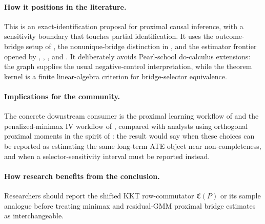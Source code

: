 \documentclass[11pt]{article}
\theoremstyle{definition}
\theoremstyle{plain}
\theoremstyle{remark}
\begin{document}
\paragraph{How it positions in the literature.}
This is an exact-identification proposal for proximal causal inference, with a sensitivity boundary that touches partial identification. It uses the outcome-bridge setup of \citet{MiaoGengTchetgen2018}, the nonunique-bridge distinction in \citet[Sections 2--3]{ZhangLiMiaoTchetgen2023}, and the estimator frontier opened by \citet{KallusMaoUehara2021}, \citet{CuiPuShiMiaoTchetgen2024}, \citet{BennettKallusMaoNeweySyrgkanisUehara2023COLT}, and \citet{BennettKallusMaoNeweySyrgkanisUehara2023MinimaxIV}. It deliberately avoids Pearl-school do-calculus extensions: the graph supplies the usual negative-control interpretation, while the theorem kernel is a finite linear-algebra criterion for bridge-selector equivalence.

\paragraph{Implications for the community.}
The concrete downstream consumer is the proximal learning workflow of \citet{KallusMaoUehara2021} and the penalized-minimax IV workflow of \citet{BennettKallusMaoNeweySyrgkanisUehara2023MinimaxIV}, compared with analysts using orthogonal proximal moments in the spirit of \citet{CuiPuShiMiaoTchetgen2024}: the result would say when these choices can be reported as estimating the same long-term ATE object near non-completeness, and when a selector-sensitivity interval must be reported instead.

\paragraph{How research benefits from the conclusion.}
Researchers should report the shifted KKT row-commutator \(\mathfrak C(P)\) or its sample analogue before treating minimax and residual-GMM proximal bridge estimates as interchangeable.
\end{document}
